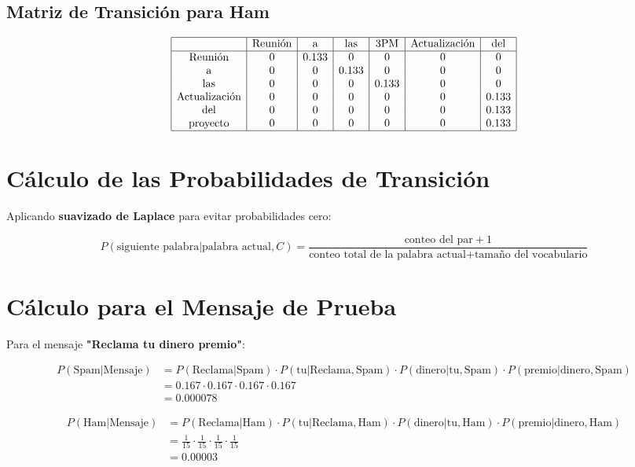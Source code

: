 \documentclass{article}
\begin{document}
\subsection{Matriz de Transición para Ham}
\begin{equation}
\begin{array}{|c|c|c|c|c|c|c|}
\hline
 & \text{Reunión} & \text{a} & \text{las} & \text{3PM} & \text{Actualización} & \text{del} \\
\hline
\text{Reunión} & 0 & 0.133 & 0 & 0 & 0 & 0 \\
\text{a} & 0 & 0 & 0.133 & 0 & 0 & 0 \\
\text{las} & 0 & 0 & 0 & 0.133 & 0 & 0 \\
\text{Actualización} & 0 & 0 & 0 & 0 & 0 & 0.133 \\
\text{del} & 0 & 0 & 0 & 0 & 0 & 0.133 \\
\text{proyecto} & 0 & 0 & 0 & 0 & 0 & 0.133 \\
\hline
\end{array}
\end{equation}

\section{Cálculo de las Probabilidades de Transición}
Aplicando \textbf{suavizado de Laplace} para evitar probabilidades cero:

\begin{equation}
P(\text{siguiente palabra} | \text{palabra actual}, C) = \frac{\text{conteo del par} + 1}{\text{conteo total de la palabra actual} + \text{tamaño del vocabulario}}
\end{equation}

\section{Cálculo para el Mensaje de Prueba}
Para el mensaje \textbf{"Reclama tu dinero premio"}:

\begin{align*}
P(\text{Spam} | \text{Mensaje}) &= P(\text{Reclama}|\text{Spam}) \cdot P(\text{tu}|\text{Reclama},\text{Spam}) \cdot P(\text{dinero}|\text{tu},\text{Spam}) \cdot P(\text{premio}|\text{dinero},\text{Spam}) \\
&= 0.167 \cdot 0.167 \cdot 0.167 \cdot 0.167 \\
&= 0.000078
\end{align*}

\begin{align*}
P(\text{Ham} | \text{Mensaje}) &= P(\text{Reclama}|\text{Ham}) \cdot P(\text{tu}|\text{Reclama},\text{Ham}) \cdot P(\text{dinero}|\text{tu},\text{Ham}) \cdot P(\text{premio}|\text{dinero},\text{Ham}) \\
&= \frac{1}{15} \cdot \frac{1}{15} \cdot \frac{1}{15} \cdot \frac{1}{15} \\
&= 0.00003
\end{align*}
\end{document}
